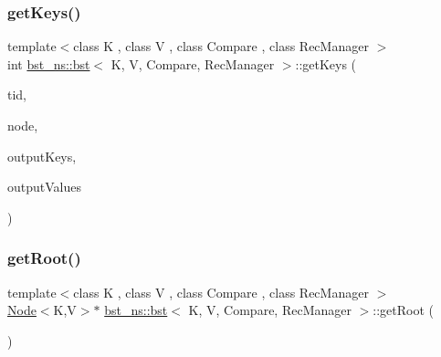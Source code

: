 \mbox{\label{classbst__ns_1_1bst_a51d37738bc278d1b640c96380bad9be9}} 
\subsubsection{\texorpdfstring{get\+Keys()}{getKeys()}}
{\footnotesize\ttfamily template$<$class K , class V , class Compare , class Rec\+Manager $>$ \\
int \hyperlink{classbst__ns_1_1bst}{bst\+\_\+ns\+::bst}$<$ K, V, Compare, Rec\+Manager $>$\+::get\+Keys (\begin{DoxyParamCaption}\item[{const int}]{tid,  }\item[{\hyperlink{classbst__ns_1_1Node}{Node}$<$ K, V $>$ $\ast$}]{node,  }\item[{K $\ast$const}]{output\+Keys,  }\item[{V $\ast$const}]{output\+Values }\end{DoxyParamCaption})\hspace{0.3cm}{\ttfamily [inline]}}

\mbox{\label{classbst__ns_1_1bst_a267da827db6252aec7a3f120bfad7c85}} 
\subsubsection{\texorpdfstring{get\+Root()}{getRoot()}}
{\footnotesize\ttfamily template$<$class K , class V , class Compare , class Rec\+Manager $>$ \\
\hyperlink{classbst__ns_1_1Node}{Node}$<$K,V$>$$\ast$ \hyperlink{classbst__ns_1_1bst}{bst\+\_\+ns\+::bst}$<$ K, V, Compare, Rec\+Manager $>$\+::get\+Root (\begin{DoxyParamCaption}\item[{void}]{ }\end{DoxyParamCaption})\hspace{0.3cm}{\ttfamily [inline]}}

\mbox{\label{classbst__ns_1_1bst_a08b4846a99c3ee33d5030d7b0edad9b7}} 
